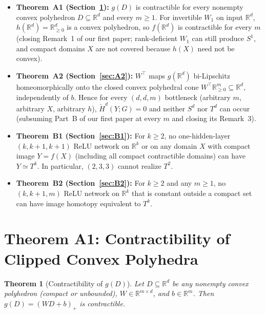 \documentclass[11pt]{article}
\theoremstyle{plain}
\newtheorem{theorem}{Theorem}
\theoremstyle{definition}
\theoremstyle{remark}
\begin{document}
\begin{itemize}[leftmargin=2em,itemsep=2pt]
\item \textbf{Theorem~A1 (Section~\ref{sec:A1}):} $g(D)$ is contractible for every nonempty convex polyhedron $D \subseteq \mathbb{R}^d$ and every $m \ge 1$. For invertible $W_1$ on input $\mathbb{R}^d$, $h(\mathbb{R}^d) = \mathbb{R}_{\ge 0}^d$ is a convex polyhedron, so $f(\mathbb{R}^d)$ is contractible for every $m$ (closing Remark~1 of our first paper; rank-deficient $W_1$ can still produce $S^1$, and compact domains $X$ are not covered because $h(X)$ need not be convex).
\item \textbf{Theorem~A2 (Section~\ref{sec:A2}):} $W^\top$ maps $g(\mathbb{R}^d)$ bi-Lipschitz homeomorphically onto the closed convex polyhedral cone $W^\top \mathbb{R}_{\ge 0}^m \subseteq \mathbb{R}^d$, independently of $b$. Hence for every $(d, d, m)$ bottleneck (arbitrary $m$, arbitrary $X$, arbitrary $h$), $\check{H}^d(Y; G) = 0$ and neither $S^d$ nor $T^d$ can occur (subsuming Part~B of our first paper at every $m$ and closing its Remark~3).
\item \textbf{Theorem~B1 (Section~\ref{sec:B1}):} For $k \ge 2$, no one-hidden-layer $(k, k+1, k+1)$ ReLU network on $\mathbb{R}^k$ or on any domain $X$ with compact image $Y = f(X)$ (including all compact contractible domains) can have $Y \simeq T^k$. In particular, $(2, 3, 3)$ cannot realize $T^2$.
\item \textbf{Theorem~B2 (Section~\ref{sec:B2}):} For $k \ge 2$ and any $m \ge 1$, no $(k, k+1, m)$ ReLU network on $\mathbb{R}^k$ that is constant outside a compact set can have image homotopy equivalent to $T^k$.
\end{itemize}

\section{Theorem A1: Contractibility of Clipped Convex Polyhedra}\label{sec:A1}

\begin{theorem}[Contractibility of $g(D)$]\label{thm:A1}
Let $D \subseteq \mathbb{R}^d$ be any nonempty convex polyhedron (compact or unbounded), $W \in \mathbb{R}^{m \times d}$, and $b \in \mathbb{R}^m$. Then $g(D) = (WD + b)_+$ is contractible.
\end{theorem}
\end{document}
